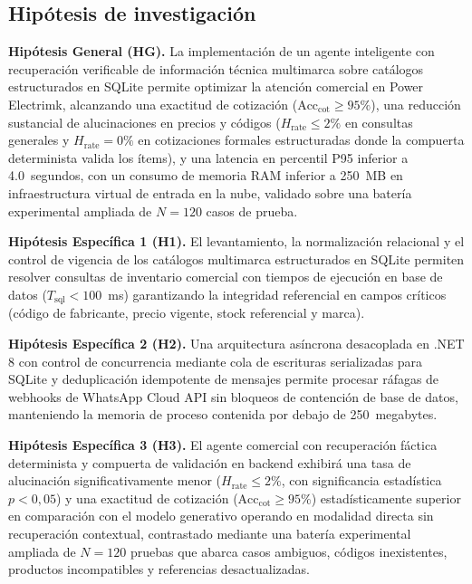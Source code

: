 \subsection{Hipótesis de investigación}

\noindent\textbf{Hipótesis General (HG).} La implementación de un agente inteligente con recuperación verificable de información técnica multimarca sobre catálogos estructurados en SQLite permite optimizar la atención comercial en Power Electrimk, alcanzando una exactitud de cotización ($\text{Acc}_{\text{cot}} \ge 95\%$), una reducción sustancial de alucinaciones en precios y códigos ($H_{\text{rate}} \le 2\%$ en consultas generales y $H_{\text{rate}} = 0\%$ en cotizaciones formales estructuradas donde la compuerta determinista valida los ítems), y una latencia en percentil P95 inferior a 4.0~segundos, con un consumo de memoria RAM inferior a 250~MB en infraestructura virtual de entrada en la nube, validado sobre una batería experimental ampliada de $N = 120$ casos de prueba.

\vspace{0.3cm}
\noindent\textbf{Hipótesis Específica 1 (H1).} El levantamiento, la normalización relacional y el control de vigencia de los catálogos multimarca estructurados en SQLite permiten resolver consultas de inventario comercial con tiempos de ejecución en base de datos ($T_{\text{sql}} < 100$~ms) garantizando la integridad referencial en campos críticos (código de fabricante, precio vigente, stock referencial y marca).

\vspace{0.3cm}
\noindent\textbf{Hipótesis Específica 2 (H2).} Una arquitectura asíncrona desacoplada en .NET 8 con control de concurrencia mediante cola de escrituras serializadas para SQLite y deduplicación idempotente de mensajes permite procesar ráfagas de webhooks de WhatsApp Cloud API sin bloqueos de contención de base de datos, manteniendo la memoria de proceso contenida por debajo de 250~megabytes.

\vspace{0.3cm}
\noindent\textbf{Hipótesis Específica 3 (H3).} El agente comercial con recuperación fáctica determinista y compuerta de validación en backend exhibirá una tasa de alucinación significativamente menor ($H_{\text{rate}} \le 2\%$, con significancia estadística $p < 0{,}05$) y una exactitud de cotización ($\text{Acc}_{\text{cot}} \ge 95\%$) estadísticamente superior en comparación con el modelo generativo operando en modalidad directa sin recuperación contextual, contrastado mediante una batería experimental ampliada de $N = 120$ pruebas que abarca casos ambiguos, códigos inexistentes, productos incompatibles y referencias desactualizadas.
